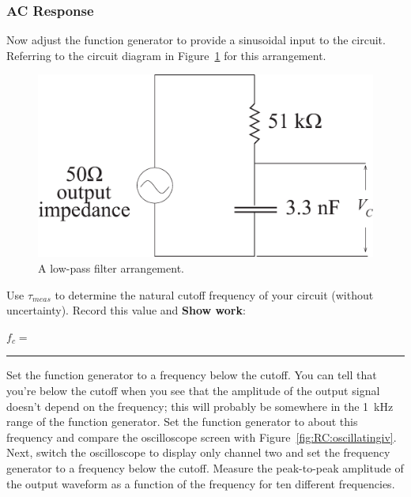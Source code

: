 \subsubsection{AC Response}
Now adjust the function generator to provide a sinusoidal input to the circuit.
Referring to the circuit diagram in Figure~\ref{fig:lowpass} for this 
arrangement. 
\begin{figure}[htb]
\epsfxsize=8cm
\centering 
\includegraphics[scale=0.5]{5_rccircuits/lowpass.eps}
\caption{A low-pass filter arrangement.}
\label{fig:lowpass}
\end{figure}
\noindent Use $\tau _{meas}$ to determine the natural cutoff frequency of your
circuit (without uncertainty).
Record this value and {\bf Show work}:
\vfill
\begin{center}
$f_c=$~ \rule{3cm}{.1mm}
\end{center}
\newpage 
\noindent Set the function generator to a 
frequency below the cutoff. You can tell that you're below the cutoff when you 
see that the amplitude of the output signal doesn't depend on the frequency;
this will probably be somewhere in the 1~kHz range of the function generator.
Set the function generator to about this frequency and compare the oscilloscope
screen with Figure~\ref{fig:RC:oscillatingiv}. 
Next, switch the oscilloscope to display only channel two and set the frequency
generator to a frequency below the cutoff. Measure the peak-to-peak amplitude of the output
waveform as a function of the frequency for ten different frequencies. \\

